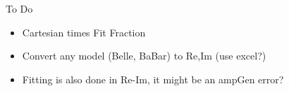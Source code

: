 \documentclass{beamer}
\begin{document}
\begin{frame}{To Do}
\begin{itemize}
\item Cartesian times Fit Fraction
\item Convert any model (Belle, BaBar) to Re,Im (use excel?)
\item Fitting is also done in Re-Im, it might be an ampGen error?
\end{itemize}
\end{frame}
\end{document}

